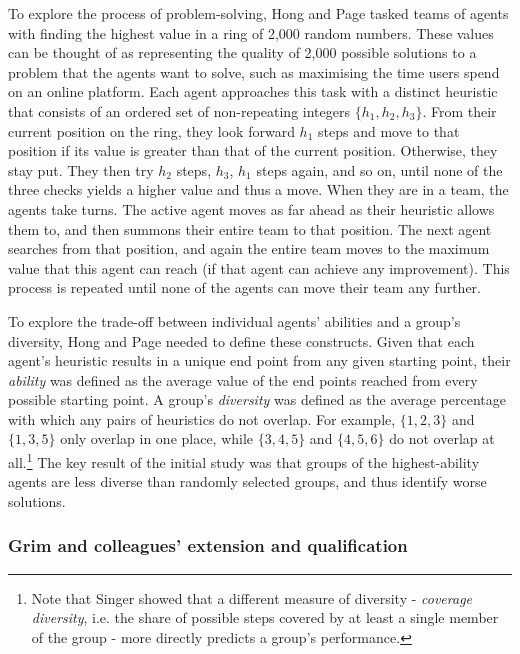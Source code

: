 To explore the process of problem-solving, Hong and Page tasked teams of agents with finding the highest value in a ring of 2,000 random numbers. These values can be thought of as representing the quality of 2,000 possible solutions to a problem that the agents want to solve, such as maximising the time users spend on an online platform. Each agent approaches this task with a distinct heuristic that consists of an ordered set of non-repeating integers $\{h_{1}, h_{2}, h_{3}\}$. From their current position on the ring, they look forward $h_{1}$ steps and move to that position if its value is greater than that of the current position. Otherwise, they stay put. They then try $h_{2}$ steps, $h_{3}$, $h_{1}$ steps again, and so on, until none of the three checks yields a higher value and thus a move. When they are in a team, the agents take turns. The active agent moves as far ahead as their heuristic allows them to, and then summons their entire team to that position. The next agent searches from that position, and again the entire team moves to the maximum value that this agent can reach (if that agent can achieve any improvement). This process is repeated until none of the agents can move their team any further.

To explore the trade-off between individual agents' abilities and a group's diversity, Hong and Page needed to define these constructs. Given that each agent's heuristic results in a unique end point from any given starting point, their \emph{ability} was defined as the average value of the end points reached from every possible starting point. A group's \emph{diversity} was defined as the average percentage with which any pairs of heuristics do not overlap. For example, $\{1, 2, 3\}$ and $\{1, 3, 5\}$ only overlap in one place, while $\{3, 4, 5\}$ and $\{4, 5, 6\}$ do not overlap at all.\footnote{Note that Singer\supercite{singer2019diversity} showed that a different measure of diversity - \emph{coverage diversity}, i.e. the share of possible steps covered by at least a single member of the group - more directly predicts a group's performance.} The key result of the initial study was that groups of the highest-ability agents are less diverse than randomly selected groups, and thus identify worse solutions.

\subsubsection{Grim and colleagues' extension and qualification}

